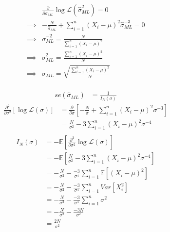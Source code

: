 \documentclass{article}
\newcommand{\E}{\mathbb{E}}
\renewcommand{\L}{\mathcal{L}}
\begin{document}
\begin{align*}
             & \frac{\partial}{\partial \hat \sigma_{ML}} \log \L(\hat \sigma_{ML}^2) = 0                    \\
    \implies & - \frac{N}{\hat \sigma_{ML}} +\sum_{i=1}^n \left(X_i - \mu\right)^2 \hat \sigma_{ML}^{-3} = 0 \\
    \implies & \hat \sigma_{ML}^{-2} = \frac{N}{\sum_{i=1}^n \left(X_i - \mu\right)^2}                       \\
    \implies & \hat \sigma_{ML}^{2} = \frac{\sum_{i=1}^n \left(X_i - \mu\right)^2}{N}                        \\
    \implies & \hat \sigma_{ML} = \sqrt{\frac{\sum_{i=1}^n \left(X_i - \mu\right)^2}{N}}                     \\
\end{align*}

\begin{align*}
    se (\hat \sigma_{ML}) & = \frac{1}{I_N (\sigma)}
\end{align*}
\begin{align*}
    \frac{\partial^2}{\partial \sigma^2} \left[ \log \L (\sigma) \right]
     & = \frac{\partial}{\partial \sigma} \left[ - \frac{N}{\sigma} +\sum_{i=1}^n \left(X_i - \mu\right)^2 \sigma^{-3} \right] \\
     & =  \frac{N}{\sigma^2} -3 \sum_{i=1}^n \left(X_i - \mu\right)^2 \sigma^{-4}                                              \\
\end{align*}
\begin{align*}
    I_N(\sigma)
     & = - \E \left[ \frac{\partial^2}{\partial \sigma^2} \log \L (\sigma) \right]                            \\
     & = - \E \left[ \frac{N}{\sigma^2} -3 \sum_{i=1}^n \left(X_i - \mu\right)^2 \sigma^{-4} \right]          \\
     & = - \frac{N}{\sigma^2} - \frac{-3}{\sigma^{4}} \sum_{i=1}^n \E \left[ \left(X_i - \mu\right)^2 \right] \\
     & = - \frac{N}{\sigma^2} - \frac{-3}{\sigma^{4}} \sum_{i=1}^n Var \left[ X_i ^2 \right]                  \\
     & = - \frac{N}{\sigma^2} - \frac{-3}{\sigma^{4}} \sum_{i=1}^n \sigma^2                                   \\
     & = - \frac{N}{\sigma^2} - \frac{-3N}{\sigma^{2}}                                                        \\
     & = \frac{2N}{\sigma^{2}}                                                                                \\
\end{align*}
\end{document}

